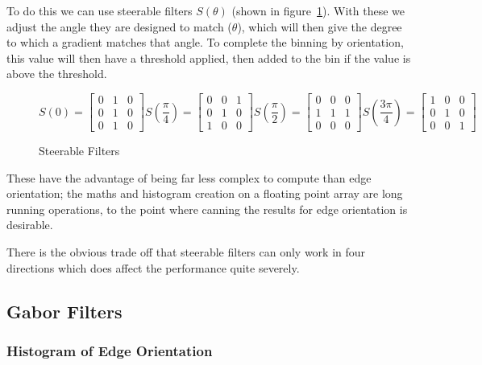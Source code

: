 To do this we can use steerable filters $S(\theta)$ (shown in figure~\ref{fig:steerable-filters}). 
With these we adjust the angle they are designed to match ($\theta$), which will then give the 
degree to which a gradient matches that angle. To complete the binning by orientation, this value 
will then have a threshold applied, then added to the bin if the value is above the threshold.

\begin{figure}[h]
$$
S\left(0\right) = 
\begin{bmatrix}
0 & 1 & 0 \\
0 & 1 & 0 \\
0 & 1 & 0
\end{bmatrix}
S\left(\frac{\pi}{4}\right) =
\begin{bmatrix}
0 & 0 & 1 \\
0 & 1 & 0 \\
1 & 0 & 0
\end{bmatrix}
S\left(\frac{\pi}{2}\right) = 
\begin{bmatrix}
0 & 0 & 0 \\
1 & 1 & 1 \\
0 & 0 & 0
\end{bmatrix}
S\left(\frac{3\pi}{4}\right) = 
\begin{bmatrix}
1 & 0 & 0 \\
0 & 1 & 0 \\
0 & 0 & 1
\end{bmatrix}
$$
\caption{Steerable Filters}
\label{fig:steerable-filters}
\end{figure}

These have the advantage of being far less complex to compute than edge orientation; the maths and
histogram creation on a floating point array are long running operations, to the point where
canning the results for edge orientation is desirable.

There is the obvious trade off that steerable filters can only work in four directions which
does affect the performance quite severely.

\subsection{Gabor Filters}



\subsubsection{Histogram of Edge Orientation}


